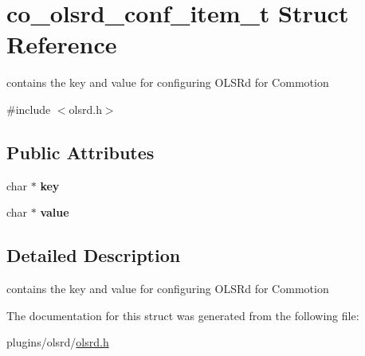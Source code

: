 \hypertarget{structco__olsrd__conf__item__t}{\section{co\-\_\-olsrd\-\_\-conf\-\_\-item\-\_\-t Struct Reference}
\label{structco__olsrd__conf__item__t}
}


contains the key and value for configuring O\-L\-S\-Rd for Commotion  




{\ttfamily \#include $<$olsrd.\-h$>$}

\subsection*{Public Attributes}
\begin{DoxyCompactItemize}
\item 
\hypertarget{structco__olsrd__conf__item__t_aff34314213116882c2ca1151b6ed5f1d}{char $\ast$ {\bfseries key}}\label{structco__olsrd__conf__item__t_aff34314213116882c2ca1151b6ed5f1d}

\item 
\hypertarget{structco__olsrd__conf__item__t_a76ad082980a4dcd32235c0738ac431e2}{char $\ast$ {\bfseries value}}\label{structco__olsrd__conf__item__t_a76ad082980a4dcd32235c0738ac431e2}

\end{DoxyCompactItemize}


\subsection{Detailed Description}
contains the key and value for configuring O\-L\-S\-Rd for Commotion 

The documentation for this struct was generated from the following file\-:\begin{DoxyCompactItemize}
\item 
plugins/olsrd/\hyperlink{olsrd_8h}{olsrd.\-h}\end{DoxyCompactItemize}
